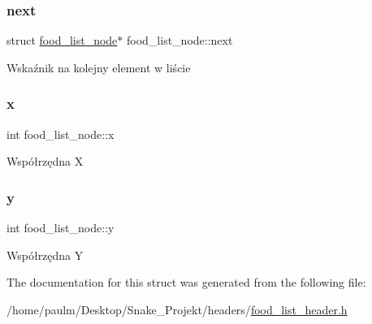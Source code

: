 \subsubsection{\texorpdfstring{next}{next}}
{\footnotesize\ttfamily struct \mbox{\hyperlink{structfood__list__node}{food\+\_\+list\+\_\+node}}$\ast$ food\+\_\+list\+\_\+node\+::next}

Wskaźnik na kolejny element w liście \mbox{\label{structfood__list__node_ab0daddf2204f2cef5744b94e027d7eda}} 
\subsubsection{\texorpdfstring{x}{x}}
{\footnotesize\ttfamily int food\+\_\+list\+\_\+node\+::x}

Współrzędna X \mbox{\label{structfood__list__node_a4e7687a6c9c4024e19508dd824dbb0f5}} 
\subsubsection{\texorpdfstring{y}{y}}
{\footnotesize\ttfamily int food\+\_\+list\+\_\+node\+::y}

Współrzędna Y 

The documentation for this struct was generated from the following file\+:\begin{DoxyCompactItemize}
\item 
/home/paulm/\+Desktop/\+Snake\+\_\+\+Projekt/headers/\mbox{\hyperlink{food__list__header_8h}{food\+\_\+list\+\_\+header.\+h}}\end{DoxyCompactItemize}
